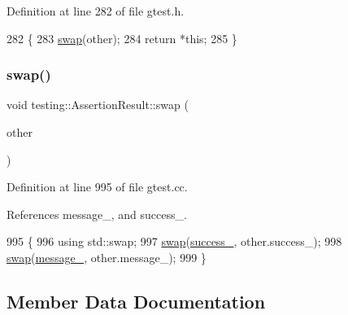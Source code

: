 Definition at line 282 of file gtest.\+h.


\begin{DoxyCode}
282                                                     \{
283     \hyperlink{classtesting_1_1AssertionResult_ab5b92c1be40f9ce9d7c3e0cf7bf65c61}{swap}(other);
284     \textcolor{keywordflow}{return} *\textcolor{keyword}{this};
285   \}
\end{DoxyCode}
\mbox{\label{classtesting_1_1AssertionResult_ab5b92c1be40f9ce9d7c3e0cf7bf65c61}} 
\subsubsection{\texorpdfstring{swap()}{swap()}}
{\footnotesize\ttfamily void testing\+::\+Assertion\+Result\+::swap (\begin{DoxyParamCaption}\item[{\hyperlink{classtesting_1_1AssertionResult}{Assertion\+Result} \&}]{other }\end{DoxyParamCaption})\hspace{0.3cm}{\ttfamily [private]}}



Definition at line 995 of file gtest.\+cc.



References message\+\_\+, and success\+\_\+.


\begin{DoxyCode}
995                                                  \{
996   \textcolor{keyword}{using} std::swap;
997   \hyperlink{classtesting_1_1AssertionResult_ab5b92c1be40f9ce9d7c3e0cf7bf65c61}{swap}(\hyperlink{classtesting_1_1AssertionResult_ae7348f9fffe7a20980dfc94fc261d7ca}{success\_}, other.success\_);
998   \hyperlink{classtesting_1_1AssertionResult_ab5b92c1be40f9ce9d7c3e0cf7bf65c61}{swap}(\hyperlink{classtesting_1_1AssertionResult_a5dee995939457def35f0bf496d070957}{message\_}, other.message\_);
999 \}
\end{DoxyCode}


\subsection{Member Data Documentation}
\mbox{\label{classtesting_1_1AssertionResult_a5dee995939457def35f0bf496d070957}} 
